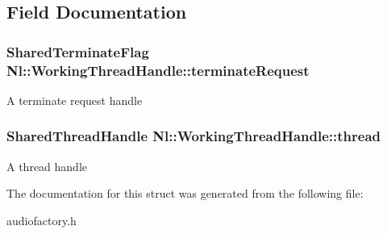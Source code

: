 \subsection{Field Documentation}
\hypertarget{structNl_1_1WorkingThreadHandle_aeaff58df70b1f63bd8a01334cb11eb93}{
\subsubsection[{terminate\-Request}]{\setlength{\rightskip}{0pt plus 5cm}Shared\-Terminate\-Flag Nl\-::\-Working\-Thread\-Handle\-::terminate\-Request}}\label{structNl_1_1WorkingThreadHandle_aeaff58df70b1f63bd8a01334cb11eb93}
A terminate request handle \hypertarget{structNl_1_1WorkingThreadHandle_a8f3a12233057ef18fd8a23e0fe115223}{
\subsubsection[{thread}]{\setlength{\rightskip}{0pt plus 5cm}Shared\-Thread\-Handle Nl\-::\-Working\-Thread\-Handle\-::thread}}\label{structNl_1_1WorkingThreadHandle_a8f3a12233057ef18fd8a23e0fe115223}
A thread handle 

The documentation for this struct was generated from the following file\-:\begin{DoxyCompactItemize}
\item 
audiofactory.\-h\end{DoxyCompactItemize}
